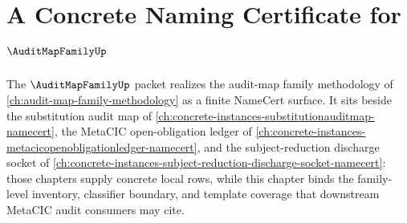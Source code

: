 \chapter{A Concrete Naming Certificate for $\AuditMapFamilyUp$}
\label{ch:concrete-instances-auditmapfamily-namecert}

The $\AuditMapFamilyUp$ packet realizes the audit-map family methodology of \autoref{ch:audit-map-family-methodology} as a finite NameCert surface. It sits beside the substitution audit map of \autoref{ch:concrete-instances-substitutionauditmap-namecert}, the MetaCIC open-obligation ledger of \autoref{ch:concrete-instances-metacicopenobligationledger-namecert}, and the subject-reduction discharge socket of \autoref{ch:concrete-instances-subject-reduction-discharge-socket-namecert}: those chapters supply concrete local rows, while this chapter binds the family-level inventory, classifier boundary, and template coverage that downstream MetaCIC audit consumers may cite.

